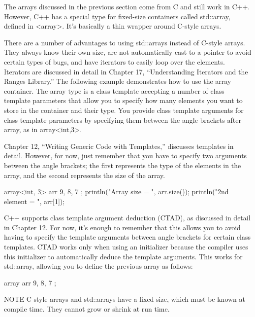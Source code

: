 
The arrays discussed in the previous section come from C and still work in C++. However, C++ has a special type for fixed-size containers called std::array, defined in <array>. It’s basically a thin wrapper around C-style arrays.


There are a number of advantages to using std::arrays instead of C-style arrays. They always know their own size, are not automatically cast to a pointer to avoid certain types of bugs, and have iterators to easily loop over the elements. Iterators are discussed in detail in Chapter 17, “Understanding Iterators and the Ranges Library.” The following example demonstrates how to use the array container. The array type is a class template accepting a number of class template parameters that allow you to specify how many elements you want to store in the container and their type. You provide class template arguments for class template parameters by specifying them between the angle brackets after array, as in array<int,3>.

Chapter 12, “Writing Generic Code with Templates,” discusses templates in detail. However, for now, just remember that you have to specify two arguments between the angle brackets; the first represents the type of the elements in the array, and the second represents the size of the array.

\begin{cpp}
array<int, 3> arr { 9, 8, 7 };
println("Array size = {}", arr.size());
println("2nd element = {}", arr[1]);
\end{cpp}

C++ supports class template argument deduction (CTAD), as discussed in detail in Chapter 12. For now, it’s enough to remember that this allows you to avoid having to specify the template arguments between angle brackets for certain class templates. CTAD works only when using an initializer because the compiler uses this initializer to automatically deduce the template arguments. This works for std::array, allowing you to define the previous array as follows:

\begin{cpp}
array arr { 9, 8, 7 };
\end{cpp}

\begin{myNotic}{NOTE}
C-style arrays and std::arrays have a fixed size, which must be known at compile time. They cannot grow or shrink at run time.
\end{myNotic}

